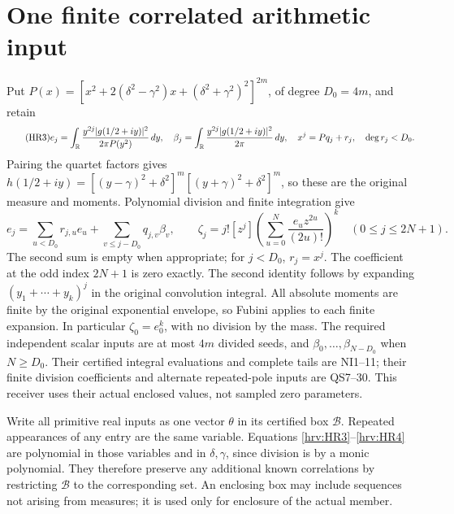\section{One finite correlated arithmetic input}

Put \(P(x)=[x^2+2(\delta^2-\gamma^2)x+
(\delta^2+\gamma^2)^2]^{2m}\), of degree \(D_0=4m\), and retain
\begin{equation}\tag{HR3}\label{hrv:HR3}
e_j=\int_\mathbb R \frac{y^{2j}|g(1/2+iy)|^2}{2\pi P(y^2)}\,dy,
\quad \beta_j=\int_\mathbb R \frac{y^{2j}|g(1/2+iy)|^2}{2\pi}\,dy,
\quad x^j=Pq_j+r_j,\quad\deg r_j<D_0.
\end{equation}
Pairing the quartet factors gives \(h(1/2+iy)=
[(y-\gamma)^2+\delta^2]^m[(y+\gamma)^2+\delta^2]^m\), so these
are the original measure and moments. Polynomial division and finite
integration give
\begin{equation}\tag{HR4}\label{hrv:HR4}
e_j=\sum_{u<D_0}r_{j,u}e_u+\sum_{v\le j-D_0}q_{j,v}\beta_v,
\qquad
\zeta_j=j![z^j]\left(\sum_{u=0}^N\frac{e_u z^{2u}}{(2u)!}\right)^k
\quad(0\le j\le2N+1).
\end{equation}
The second sum is empty when appropriate; for \(j<D_0\), \(r_j=x^j\).
The coefficient at the odd index \(2N+1\) is zero exactly. The second
identity follows by expanding \((y_1+\cdots+y_k)^j\) in the original
convolution integral. All absolute moments are finite by the original
exponential envelope, so Fubini applies to each finite expansion.
In particular \(\zeta_0=e_0^k\), with no division by the mass.
The required independent scalar inputs are at most \(4m\) divided
seeds, and \(\beta_0,\ldots,\beta_{N-D_0}\) when \(N\ge D_0\).
Their certified integral evaluations and complete tails are NI1--11;
their finite division coefficients and alternate repeated-pole inputs
are QS7--30. This receiver uses their actual enclosed values, not
sampled zero parameters.

Write all primitive real inputs as one vector \(\theta\) in its
certified box \(\mathcal B\). Repeated appearances of any entry are
the same variable. Equations \eqref{hrv:HR3}--\eqref{hrv:HR4} are polynomial
in those variables and in \(\delta,\gamma\), since division is by a
monic polynomial. They therefore preserve any additional known
correlations by restricting \(\mathcal B\) to the corresponding set.
An enclosing box may include sequences not arising from measures;
it is used only for enclosure of the actual member.

